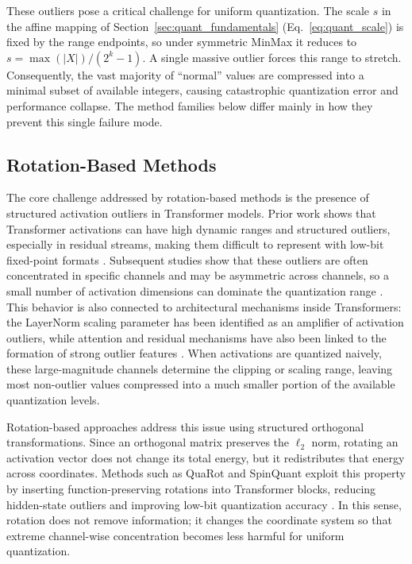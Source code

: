 These outliers pose a critical challenge for uniform quantization. The scale $s$ in the affine mapping of Section~\ref{sec:quant_fundamentals} (Eq.~\ref{eq:quant_scale}) is fixed by the range endpoints, so under symmetric MinMax it reduces to $s = \max(|X|)/(2^k-1)$. A single massive outlier forces this range to stretch. Consequently, the vast majority of ``normal'' values are compressed into a minimal subset of available integers, causing catastrophic quantization error and performance collapse. The method families below differ mainly in how they prevent this single failure mode.


\subsection{Rotation-Based Methods}

The core challenge addressed by rotation-based methods is the presence of structured activation outliers in Transformer models. Prior work shows that Transformer activations can have high dynamic ranges and structured outliers, especially in residual streams, making them difficult to represent with low-bit fixed-point formats \cite{bondarenko2021understanding}. Subsequent studies show that these outliers are often concentrated in specific channels and may be asymmetric across channels, so a small number of activation dimensions can dominate the quantization range \cite{wei2023outlier+}. This behavior is also connected to architectural mechanisms inside Transformers: the LayerNorm scaling parameter has been identified as an amplifier of activation outliers, while attention and residual mechanisms have also been linked to the formation of strong outlier features \cite{wei2022outlier,bondarenko2023quantizable}. When activations are quantized naively, these large-magnitude channels determine the clipping or scaling range, leaving most non-outlier values compressed into a much smaller portion of the available quantization levels.

Rotation-based approaches address this issue using structured orthogonal transformations. Since an orthogonal matrix preserves the $\ell_2$ norm, rotating an activation vector does not change its total energy, but it redistributes that energy across coordinates. Methods such as QuaRot and SpinQuant exploit this property by inserting function-preserving rotations into Transformer blocks, reducing hidden-state outliers and improving low-bit quantization accuracy \cite{ashkboos2024quarot,liu2025spinquant}. In this sense, rotation does not remove information; it changes the coordinate system so that extreme channel-wise concentration becomes less harmful for uniform quantization.




